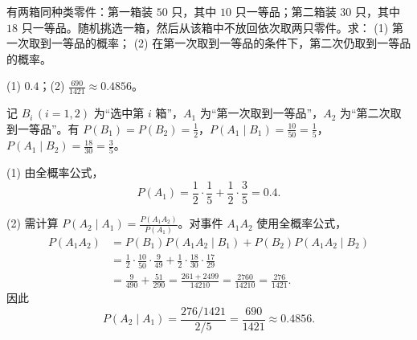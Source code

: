 \begin{exercise}[title={两箱零件的连续不放回抽样},level=standard,points=10,tags={全概率公式,贝叶斯公式}]
有两箱同种类零件：第一箱装 $50$ 只，其中 $10$ 只一等品；第二箱装 $30$ 只，其中 $18$ 只一等品。随机挑选一箱，然后从该箱中不放回依次取两只零件。求：
(1) 第一次取到一等品的概率；
(2) 在第一次取到一等品的条件下，第二次仍取到一等品的概率。
\begin{answer}
(1) $0.4$；(2) $\frac{690}{1421}\approx 0.4856$。
\end{answer}
\begin{solution}
记 $B_i\,(i=1,2)$ 为“选中第 $i$ 箱”，$A_1$ 为“第一次取到一等品”，$A_2$ 为“第二次取到一等品”。有 $P(B_1)=P(B_2)=\frac{1}{2}$，$P(A_1\mid B_1)=\frac{10}{50}=\frac{1}{5}$，$P(A_1\mid B_2)=\frac{18}{30}=\frac{3}{5}$。

(1) 由全概率公式，
\[
  P(A_1)=\frac{1}{2}\cdot\frac{1}{5}+\frac{1}{2}\cdot\frac{3}{5}=0.4.
\]

(2) 需计算 $P(A_2\mid A_1)=\frac{P(A_1A_2)}{P(A_1)}$。对事件 $A_1A_2$ 使用全概率公式，
\[
\begin{aligned}
  P(A_1A_2)&=P(B_1)P(A_1A_2\mid B_1)+P(B_2)P(A_1A_2\mid B_2)\\
  &=\frac{1}{2}\cdot\frac{10}{50}\cdot\frac{9}{49}+\frac{1}{2}\cdot\frac{18}{30}\cdot\frac{17}{29}\\
  &=\frac{9}{490}+\frac{51}{290}=\frac{261+2499}{14210}=\frac{2760}{14210}=\frac{276}{1421}.
\end{aligned}
\]
因此
\[
  P(A_2\mid A_1)=\frac{276/1421}{2/5}=\frac{690}{1421}\approx 0.4856.
\]
\end{solution}
\end{exercise}

